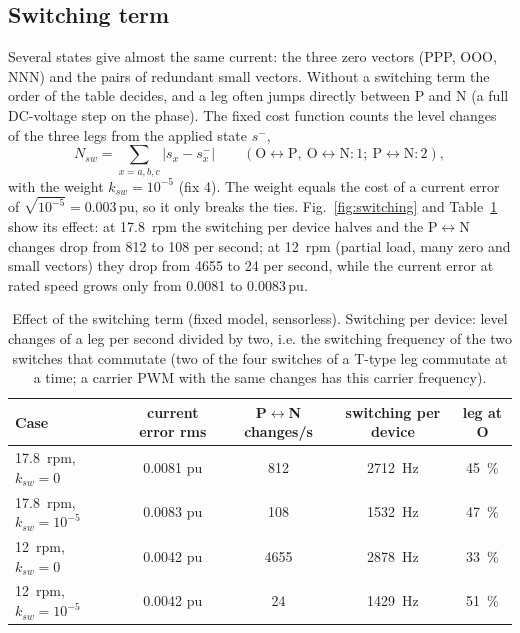 \documentclass[10pt,a4paper]{scrartcl}
\newcommand{\pu}{\,\mathrm{pu}}
\begin{document}
\begin{onehalfspace}
\subsection{Switching term}
\label{sec:switching}

Several states give almost the same current: the three zero vectors (PPP, OOO, NNN) and the pairs of redundant small vectors. Without a switching term the order of the table decides, and a leg often jumps directly between P and N (a full DC-voltage step on the phase). The fixed cost function counts the level changes of the three legs from the applied state $s^-$,
\begin{equation}
N_{sw} = \sum_{x = a,b,c} |s_x - s_x^-| \qquad (\text{O}\leftrightarrow\text{P},\ \text{O}\leftrightarrow\text{N}: 1; \ \text{P}\leftrightarrow\text{N}: 2),
\label{eq:nsw}
\end{equation}
with the weight $k_{sw} = 10^{-5}$ (fix 4). The weight equals the cost of a current error of $\sqrt{10^{-5}} = 0.003\pu$, so it only breaks the ties. Fig.~\ref{fig:switching} and Table~\ref{tab:switching} show its effect: at \SI{17.8}{rpm} the switching per device halves and the P$\leftrightarrow$N changes drop from 812 to 108 per second; at \SI{12}{rpm} (partial load, many zero and small vectors) they drop from 4655 to 24 per second, while the current error at rated speed grows only from 0.0081 to $0.0083\pu$.

\begin{table}[htb]
\centering
\caption{Effect of the switching term (fixed model, sensorless). Switching per device: level changes of a leg per second divided by two, i.e. the switching frequency of the two switches that commutate (two of the four switches of a T-type leg commutate at a time; a carrier PWM with the same changes has this carrier frequency).}
\label{tab:switching}
\small
\begin{tabular}{lcccc}
\toprule
Case & current error rms & P$\leftrightarrow$N changes/s & switching per device & leg at O \\
\midrule
\SI{17.8}{rpm}, $k_{sw} = 0$ & 0.0081 pu & 812 & \SI{2712}{Hz} & \SI{45}{\percent} \\
\SI{17.8}{rpm}, $k_{sw} = 10^{-5}$ & 0.0083 pu & 108 & \SI{1532}{Hz} & \SI{47}{\percent} \\
\SI{12}{rpm}, $k_{sw} = 0$ & 0.0042 pu & 4655 & \SI{2878}{Hz} & \SI{33}{\percent} \\
\SI{12}{rpm}, $k_{sw} = 10^{-5}$ & 0.0042 pu & 24 & \SI{1429}{Hz} & \SI{51}{\percent} \\
\bottomrule
\end{tabular}
\end{table}


\end{onehalfspace}
\end{document}
